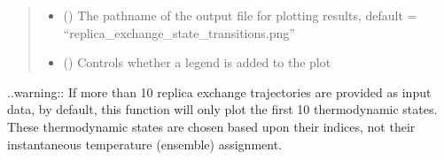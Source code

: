 \documentclass[letterpaper,12pt,english,openany,oneside]{sphinxmanual}
\begin{document}
\begin{fulllineitems}
\begin{quote}
\begin{description}
\begin{itemize}
\item {} 
 () \textendash{} The pathname of the output file for plotting results, default = “replica\_exchange\_state\_transitions.png”

\item {} 
 () \textendash{} Controls whether a legend is added to the plot

\end{itemize}

\end{description}\end{quote}

..warning:: If more than 10 replica exchange trajectories are provided as input data, by default, this function will only plot the first 10 thermodynamic states.  These thermodynamic states are chosen based upon their indices, not their instantaneous temperature (ensemble) assignment.

\end{fulllineitems}

\label{\detokenize{simulation:module-simulation.tools}}
\end{document}
